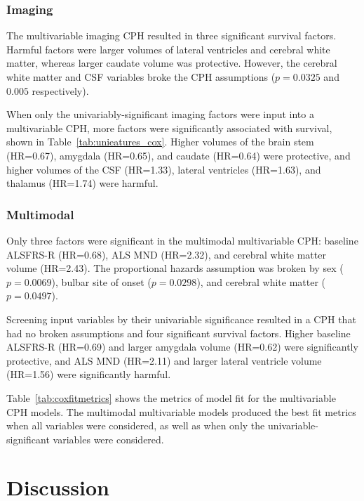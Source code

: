 \subsubsection{Imaging}
The multivariable imaging CPH resulted in three significant survival factors.
Harmful factors were larger volumes of lateral ventricles and cerebral white matter, whereas larger caudate volume was protective.
However, the cerebral white matter and CSF variables broke the CPH assumptions ($p=0.0325$ and $0.005$ respectively).

When only the univariably-significant imaging factors were input into a multivariable CPH, more factors were significantly associated with survival, shown in Table~\ref{tab:unieatures_cox}.
Higher volumes of the brain stem (HR=0.67), amygdala (HR=0.65), and caudate (HR=0.64) were protective, and higher volumes of the CSF (HR=1.33), lateral ventricles (HR=1.63), and thalamus (HR=1.74) were harmful.

\subsubsection{Multimodal}
Only three factors were significant in the multimodal multivariable CPH: baseline ALSFRS-R (HR=0.68), ALS MND (HR=2.32), and cerebral white matter volume (HR=2.43).
The proportional hazards assumption was broken by sex ($p=0.0069$), bulbar site of onset ($p=0.0298$), and cerebral white matter ($p=0.0497$).

Screening input variables by their univariable significance resulted in a CPH that had no broken assumptions and four significant survival factors.
Higher baseline ALSFRS-R (HR=0.69) and larger amygdala volume (HR=0.62) were significantly protective, and ALS MND (HR=2.11) and larger lateral ventricle volume (HR=1.56) were significantly harmful.

Table~\ref{tab:coxfitmetrics} shows the metrics of model fit for the multivariable CPH models.
The multimodal multivariable models produced the best fit metrics when all variables were considered, as well as when only the univariable-significant variables were considered.

\section{Discussion}

